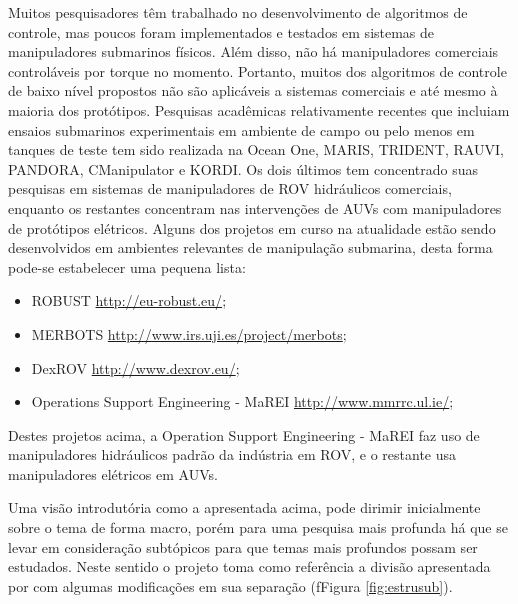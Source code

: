 Muitos pesquisadores \cite{wang2008novel} \cite{suboh2009modeling} \cite{golea2002fuzzy} \cite{pandian2010neuro} têm trabalhado no desenvolvimento de algoritmos de controle, mas poucos foram implementados e testados em sistemas de manipuladores submarinos físicos. 
Além disso, não há manipuladores comerciais controláveis ​​por torque no momento. Portanto, muitos dos algoritmos de controle de baixo nível propostos não são aplicáveis ​​a sistemas comerciais e até mesmo à maioria dos protótipos. Pesquisas acadêmicas relativamente recentes que incluiam ensaios submarinos experimentais em ambiente de campo ou pelo menos em tanques de teste tem sido realizada na Ocean One, MARIS, TRIDENT, RAUVI, PANDORA, CManipulator e KORDI. 
Os dois últimos tem concentrado suas pesquisas em sistemas de manipuladores de ROV hidráulicos comerciais, enquanto os restantes concentram nas intervenções de AUVs com manipuladores de protótipos elétricos. 
Alguns dos projetos em curso na atualidade estão sendo desenvolvidos em ambientes relevantes de manipulação submarina, desta forma pode-se estabelecer uma pequena lista:
\begin{itemize}
	\item ROBUST \url{http://eu-robust.eu/};
	\item MERBOTS \url{http://www.irs.uji.es/project/merbots}; 
	\item DexROV \url{http://www.dexrov.eu/};
	\item Operations Support Engineering - MaREI \url{http://www.mmrrc.ul.ie/};
\end{itemize}
 
Destes projetos acima, a Operation Support Engineering - MaREI faz uso de manipuladores hidráulicos padrão da indústria em ROV, e o restante usa manipuladores elétricos em AUVs.

Uma visão introdutória como a apresentada acima, pode dirimir inicialmente sobre o tema de forma macro, porém para uma pesquisa mais profunda há que se levar em consideração subtópicos para que temas mais profundos possam ser estudados. Neste sentido o projeto toma como referência a divisão apresentada por  com algumas modificações em sua separação (fFigura \ref{fig:estrusub}).
 
